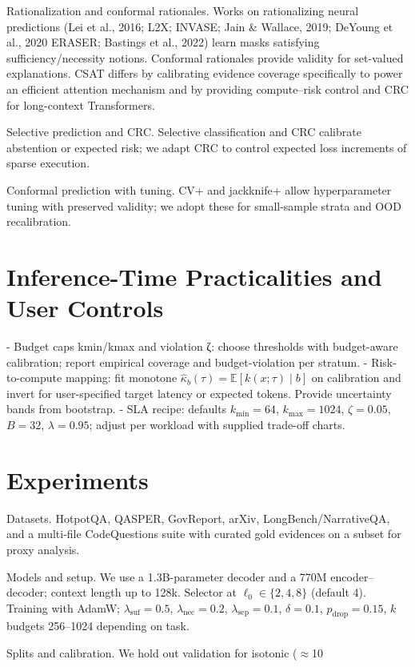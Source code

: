 \documentclass[11pt]{article}
\begin{document}
Rationalization and conformal rationales. Works on rationalizing neural predictions (Lei et al., 2016; L2X; INVASE; Jain \& Wallace, 2019; DeYoung et al., 2020 ERASER; Bastings et al., 2022) learn masks satisfying sufficiency/necessity notions. Conformal rationales provide validity for set-valued explanations. CSAT differs by calibrating evidence coverage specifically to power an efficient attention mechanism and by providing compute–risk control and CRC for long-context Transformers.

Selective prediction and CRC. Selective classification and CRC calibrate abstention or expected risk; we adapt CRC to control expected loss increments of sparse execution.

Conformal prediction with tuning. CV+ and jackknife+ allow hyperparameter tuning with preserved validity; we adopt these for small-sample strata and OOD recalibration.

\section{Inference-Time Practicalities and User Controls}
- Budget caps kmin/kmax and violation ζ: choose thresholds with budget-aware calibration; report empirical coverage and budget-violation per stratum.
- Risk-to-compute mapping: fit monotone $\hat{\kappa}_b(\tau)=\mathbb{E}[k(x;\tau)\mid b]$ on calibration and invert for user-specified target latency or expected tokens. Provide uncertainty bands from bootstrap.
- SLA recipe: defaults $k_{\min}{=}64$, $k_{\max}{=}1024$, $\zeta{=}0.05$, $B{=}32$, $\lambda{=}0.95$; adjust per workload with supplied trade-off charts.

\section{Experiments}
Datasets. HotpotQA, QASPER, GovReport, arXiv, LongBench/NarrativeQA, and a multi-file CodeQuestions suite with curated gold evidences on a subset for proxy analysis.

Models and setup. We use a 1.3B-parameter decoder and a 770M encoder–decoder; context length up to 128k. Selector at $\ell_0\in\{2,4,8\}$ (default 4). Training with AdamW; $\lambda_{\text{suf}}{=}0.5$, $\lambda_{\text{nec}}{=}0.2$, $\lambda_{\text{sep}}{=}0.1$, $\delta{=}0.1$, $p_{\text{drop}}{=}0.15$, $k$ budgets 256–1024 depending on task.

Splits and calibration. We hold out validation for isotonic ($\approx$10%
\end{document}

